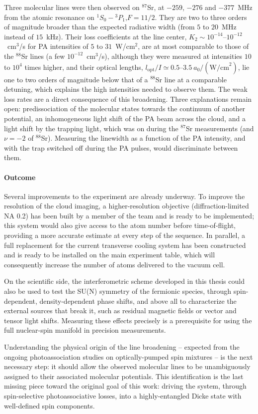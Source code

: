Three molecular lines were then observed on $^{87}$Sr, at $-259$, $-276$ and $-377$~MHz from
the atomic resonance on $^1S_0 - {}^3P_1 \text{,} F=11/2$. They are two to three orders of magnitude broader than the expected
radiative width (from $5$ to $20$~MHz instead of $15$~kHz). Their loss coefficients at the line
center, $K_2\sim10^{-14}$--$10^{-12}$~cm$^3$/s for PA intensities of $5$ to $31$~W/cm$^2$, are at
most comparable to those of the $^{88}$Sr lines (a few $10^{-12}$~cm$^3$/s), although they were
measured at intensities $10$ to $10^4$ times higher, and their optical lengths,
$l_{\text{opt}}/I\simeq0.5$--$3.5~a_0/(\text{W/cm}^2)$, lie one to two orders of magnitude below
that of a $^{88}$Sr line at a comparable detuning, which explains the high intensities needed to
observe them. The weak loss rates are a direct consequence of this broadening. Three
explanations remain open: predissociation of the molecular states towards the continuum of
another potential, an inhomogeneous light shift of the PA beam across the cloud, and a light
shift by the trapping light, which was on during the $^{87}$Sr measurements (and $\nu = -2$ of $^{88}$Sr).
Measuring the linewidth as a function of the PA intensity, and with the trap switched off during the PA pulses,
would discriminate between them.

\paragraph{Outcome}
Several improvements to the experiment are already underway. To improve the resolution of the cloud imaging, 
a higher-resolution objective (diffraction-limited NA 0.2) has been built by a member of the team and is ready to be implemented; this system would also 
give access to the atom number before time-of-flight, providing a more accurate estimate at every step of the 
sequence. In parallel, a full replacement for the current transverse cooling system has been constructed and 
is ready to be installed on the main experiment table, which will consequently increase the number of atoms 
delivered to the vacuum cell.

On the scientific side, the interferometric scheme developed in this thesis could also be used to test the
SU(N) symmetry of the fermionic species, through spin-dependent, density-dependent phase shifts, and above all
to characterize the external sources that break it, such as residual magnetic fields or vector and tensor light
shifts. Measuring these effects precisely is a prerequisite for using the full nuclear-spin manifold in
precision measurements.

Understanding the physical origin of the line broadening -- expected from the ongoing photoassociation studies 
on optically-pumped spin mixtures -- is the next necessary step: it should allow the observed molecular lines to be unambiguously assigned to their associated molecular 
potentials. This identification is the last missing piece toward the original goal of this work: driving the 
system, through spin-selective photoassociative losses, into a highly-entangled Dicke state with well-defined 
spin components.